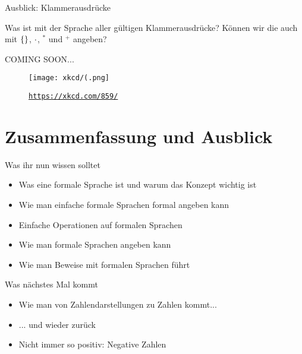 



\begin{frame}{Ausblick: Klammerausdrücke}
	
	Was ist mit der Sprache aller gültigen Klammerausdrücke? Können wir die auch mit $\left\{\right\}$, $\cdot$, ${}^*$ und ${}^+$ angeben? \\[1em]
	\pause
	
	\begin{block}{}
		\Large
		\centering
		COMING SOON... \\[1em]
	\end{block}

	\begin{figure}[H]
		\centering
		\texttt{[image: xkcd/(.png]}
		\vspace{-7pt}
		\caption{ \texttt{\url{https://xkcd.com/859/}} }
	\end{figure}
\end{frame}

%

\appendix
\beginbackup

\section{Zusammenfassung und Ausblick}

\begin{frame}	
	\begin{block}{Was ihr nun wissen solltet}
		\begin{itemize}
			\item Was eine formale Sprache ist und warum das Konzept wichtig ist
			\item Wie man einfache formale Sprachen formal angeben kann
			\item Einfache Operationen auf formalen Sprachen
			\item Wie man formale Sprachen angeben kann
			\item Wie man Beweise mit formalen Sprachen führt
		\end{itemize}
	\end{block}
	
	\begin{block}{Was nächstes Mal kommt}
		\begin{itemize}
			\item Wie man von Zahlendarstellungen zu Zahlen kommt...
			\item[] ... und wieder zurück
			\item Nicht immer so positiv: Negative Zahlen
		\end{itemize}
	\end{block}
\end{frame}





\backupend


